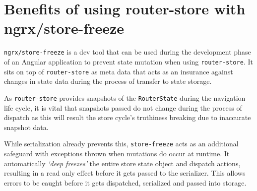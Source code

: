 \section{Benefits of using router-store with ngrx/store-freeze}
\texttt{ngrx/store-freeze} is a dev tool that can be used during the development
phase of an Angular application to prevent state mutation when using
\texttt{router-store}. It sits on top of \texttt{router-store} as meta data that
acts as an insurance against changes in state data during the process of
transfer to state storage.

As \texttt{router-store} provides snapshots of the \texttt{RouterState} during
the navigation life cycle, it is vital that snapshots passed do not change
during the process of dispatch as this will result the store cycle’s truthiness
breaking due to inaccurate snapshot data.

While serialization already prevents this, \texttt{store-freeze} acts as an
additional safeguard with exceptions thrown when mutations do occur at runtime.
It automatically \emph{`deep freezes'} the entire store state object and
dispatch actions, resulting in a read only effect before it gets passed to the
serializer. This allows errors to be caught before it gets dispatched,
serialized and passed into storage.

